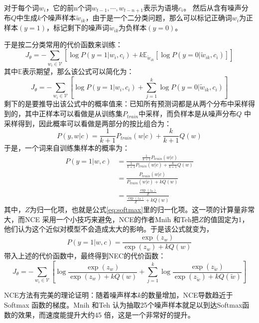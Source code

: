 \documentclass[12pt,a4paper]{article}
\begin{document}
对于每个词${w_i}$，它的前n个词${w_{t-1},\cdots,w_{t-n+1}}$表示为语境${c_i}$。 然后从含有噪声分布$Q$中生成$k$个噪声样本${\tilde{w}_{ik}}$，由于是一个二分类问题，那么可以标记正确词$w_i$为正样本${(y=1)}$，标记剩下的噪声词${\tilde{w}_{ik}}$为负样本${(y=0)}$。

于是按二分类常用的代价函数来训练：
\begin{equation}
J_\theta = -\sum\limits_{w_i \in \mathcal{V}}{[\log P(y=1|w_i, c_i) + k\mathbb{E}_{\tilde{w}_{ik}}[\log P(y=0|\tilde{w}_{ik}, c_i)]]}
\end{equation}
其中$\mathbb{E}$表示期望，那么该公式可以简化为：
\begin{equation}
J_\theta = -\sum\limits_{w_i \in \mathcal{V}}{[\log P(y=1|w_i, c_i) + \sum\limits_{j=1}^k{\log P(y=0|\tilde{w}_{ik}, c_i)}]}
\end{equation}
剩下的是要推导出该公式中的概率值来：已知所有预测词都是从两个分布中采样得到的，其中正样本可以看做是从训练集${P_{train}}$中采样，而负样本是从噪声分布$Q$ 中采样得到，因此概率可以看做是两部分的按比组合为：
\begin{equation}
P(y,w|c) = \frac{1}{k+1} P_{train}(w|c) + \frac{k}{k+1}Q(w)
\end{equation}
于是，一个词来自训练集样本的概率为：
\begin{equation}
\begin{split}
P(y=1|w,c) &=  \frac{\frac{1}{k+1} P_{train}(w|c)}{\frac{1}{k+1} P_{train}(w|c) + \frac{k}{k+1}Q(w)} \\
           &= \frac{P_{train}(w|c)}{P_{train}(w|c) + kQ(w)} \\
           &= \frac{\frac{\exp(z_w)}{Z}}{\frac{\exp(z_w)}{Z} + kQ(w)}
\end{split}
\end{equation}
其中，$Z$为归一化项，也就是公式\ref{eq:softmax}里的归一化项。这一项的计算量非常大，而NCE 采用一个小技巧来避免，NCE的作者Mnih 和Teh把$Z$的值固定为1，他们认为这个近似对模型不会造成太大的影响。于是该公式就变为，
\begin{equation}
  P(y=1|w,c) = \frac{\exp(z_w)}{\exp(z_w) + kQ(w)}
\end{equation}
带入上述的代价函数中，最终得到NEC的代价函数：
\begin{equation}
J_\theta = -\sum\limits_{w_i \in \mathcal{V}}{\left[\log \frac{\exp(z_w)}{\exp(z_w) + kQ(w)} + \sum\limits_{j=1}^k{\log \frac{\exp(z_{\tilde{w}})}{\exp(z_{\tilde{w}}) + kQ(\tilde{w})}}\right]}
\end{equation}

NCE方法有完美的理论证明：随着噪声样本$k$的数量增加，NCE导数趋近于Softmax 函数的梯度。Mnih 和Teh 认为抽取25个噪声样本就足以到达Softmax函数的效果，而速度能提升大约45 倍，这是一个非常好的提升\cite{DBLP:conf/icml/MnihT12}。
\end{document}
